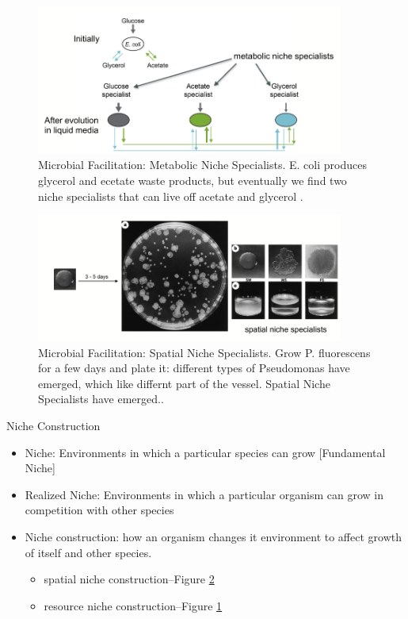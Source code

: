 \documentclass[]{article}
\begin{document}
\begin{figure}[H]
	\caption[Microbial Facilitation: Metabolic Niche Specialists]{Microbial Facilitation: Metabolic Niche Specialists. E. coli produces glycerol and ecetate waste products, but eventually we find two niche specialists that can live off acetate and glycerol \cite{escalante2015ecological}.}\label{fig:EColiEvolution}
	\includegraphics[width=0.9\textwidth]{EColiEvolution}
\end{figure}

\begin{figure}[H]
	\caption[Microbial Facilitation: Spatial Niche Specialists]{Microbial Facilitation: Spatial Niche Specialists. Grow P. fluorescens for a few days and plate it: different types of Pseudomonas have emerged, which like differnt part of the vessel. Spatial Niche Specialists have emerged.\cite{rainey1998adaptive}. }\label{fig:NicheSpecialization}
	\includegraphics[width=0.9\textwidth]{NicheSpecialization}
\end{figure}

Niche Construction

\begin{itemize}
	\item Niche: Environments in which a particular species can grow [Fundamental Niche]
	\item Realized Niche: Environments in which a particular organism can grow in competition with other species
	\item Niche construction: how an organism changes it environment to affect growth of itself and other species.
	\begin{itemize}
		\item spatial niche construction--Figure \ref{fig:NicheSpecialization}
		\item resource niche construction--Figure \ref{fig:EColiEvolution}
	\end{itemize}  
\end{itemize}
\end{document}
